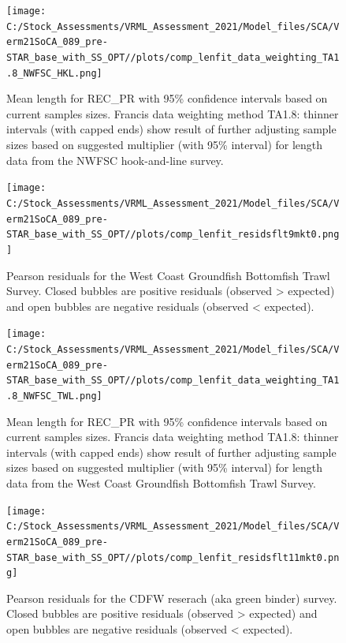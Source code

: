 \documentclass[11pt,
  english,
  a4paper,
]{article}
\begin{document}
\begin{figure}
\centering
\texttt{[image: C:/Stock\_Assessments/VRML\_Assessment\_2021/Model\_files/SCA/Verm21SoCA\_089\_pre-STAR\_base\_with\_SS\_OPT//plots/comp\_lenfit\_data\_weighting\_TA1.8\_NWFSC\_HKL.png]}
\caption{Mean length for REC\_PR with 95\% confidence intervals based on current samples sizes. Francis data weighting method TA1.8: thinner intervals (with capped ends) show result of further adjusting sample sizes based on suggested multiplier (with 95\% interval) for length data from the NWFSC hook-and-line survey.\label{fig:mean-len-fit-NWFSC-HKL}}
\end{figure}

\begin{figure}
\centering
\texttt{[image: C:/Stock\_Assessments/VRML\_Assessment\_2021/Model\_files/SCA/Verm21SoCA\_089\_pre-STAR\_base\_with\_SS\_OPT//plots/comp\_lenfit\_residsflt9mkt0.png]}
\caption{Pearson residuals for the West Coast Groundfish Bottomfish Trawl Survey. Closed bubbles are positive residuals (observed \textgreater{} expected) and open bubbles are negative residuals (observed \textless{} expected).\label{fig:len-pearson-NWFSC-TWL}}
\end{figure}

\begin{figure}
\centering
\texttt{[image: C:/Stock\_Assessments/VRML\_Assessment\_2021/Model\_files/SCA/Verm21SoCA\_089\_pre-STAR\_base\_with\_SS\_OPT//plots/comp\_lenfit\_data\_weighting\_TA1.8\_NWFSC\_TWL.png]}
\caption{Mean length for REC\_PR with 95\% confidence intervals based on current samples sizes. Francis data weighting method TA1.8: thinner intervals (with capped ends) show result of further adjusting sample sizes based on suggested multiplier (with 95\% interval) for length data from the West Coast Groundfish Bottomfish Trawl Survey.\label{fig:mean-len-fit-NWFSC-TWL}}
\end{figure}

\begin{figure}
\centering
\texttt{[image: C:/Stock\_Assessments/VRML\_Assessment\_2021/Model\_files/SCA/Verm21SoCA\_089\_pre-STAR\_base\_with\_SS\_OPT//plots/comp\_lenfit\_residsflt11mkt0.png]}
\caption{Pearson residuals for the CDFW reserach (aka green binder) survey. Closed bubbles are positive residuals (observed \textgreater{} expected) and open bubbles are negative residuals (observed \textless{} expected).\label{fig:len-pearson-CDFW-RESEARCH}}
\end{figure}
\end{document}
